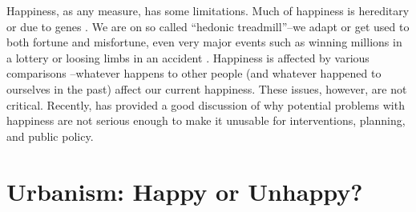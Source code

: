 \documentclass[12pt, letterpaper]{article}
\begin{document}
\begin{spacing}{1.9}

Happiness, as  any measure, has some limitations. Much of happiness is hereditary or due to genes \citep{lykken96t}.   We are on so called ``hedonic
treadmill''--we adapt or get used to both fortune and misfortune, even very major
events such as winning millions in a lottery or loosing limbs in an accident \citep{brickman78cj}. 
 Happiness is affected by various comparisons
\citep{michalos85}--whatever happens to other people (and whatever happened to
ourselves in the past) affect  our current happiness. These issues, however,
are not critical. 
Recently, \citet{diener09} has provided a good
discussion of why potential problems with happiness are not serious
enough to make it unusable for interventions, planning, and public policy. %


\section*{Urbanism: Happy or Unhappy?}


\end{spacing}
\end{document}
